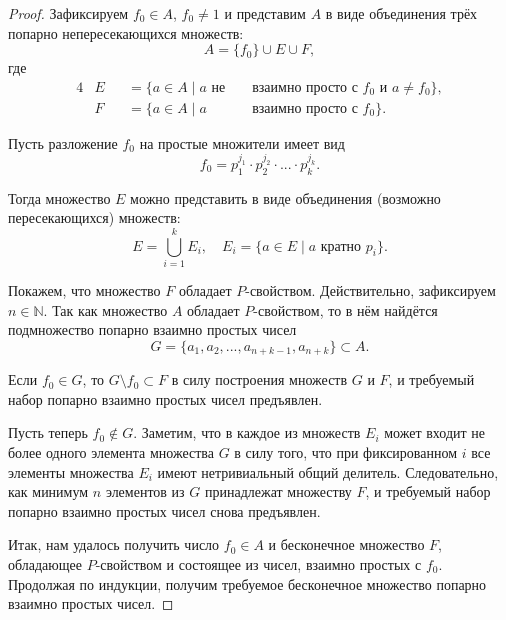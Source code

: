 \documentclass[a4paper,openbib]{article}
\theoremstyle{definition}
\begin{document}
\begin{proof}
	Зафиксируем $f_0\in A$, $f_0 \neq 1$ и представим $A$ в виде объединения трёх попарно непересекающихся множеств:
	\begin{equation}
		A = \{f_0\} \cup E \cup F
		,
	\end{equation}
	где
	\begin{alignat*}{4}
		& E &&= \{ a \in A \mid a \mbox{~не~}&&\mbox{взаимно просто с~} f_0 \mbox{~и~} a\neq f_0\}
		,
		\\
		& F &&= \{ a \in A \mid a            &&\mbox{взаимно просто с~} f_0 \}
		.
	\end{alignat*}

	Пусть разложение $f_0$ на простые множители имеет вид
	\begin{equation}
		f_0 = p_1^{j_1} \cdot p_2^{j_2} \cdot ... \cdot p_k^{j_k}
		.
	\end{equation}

	Тогда множество $E$ можно представить в виде объединения (возможно пересекающихся) множеств:
	\begin{equation}
		E = \bigcup_{i=1}^{k} E_i,\quad E_i = \{a\in E \mid a \mbox{~кратно~} p_i\}
		.
	\end{equation}

	Покажем, что множество $F$ обладает $P$-свойством.
	Действительно, зафиксируем $n\in\mathbb{N}$.
	Так как множество $A$ обладает $P$-свойством,
	то в нём найдётся подмножество попарно взаимно простых чисел
	$$G=\{a_1, a_2, ..., a_{n+k-1}, a_{n+k}\}\subset A.$$

	Если $f_0\in G$, то $G\setminus f_0 \subset F$ в силу построения множеств $G$ и $F$, и требуемый набор попарно взаимно простых чисел предъявлен.

	Пусть теперь $f_0\notin G$.
	Заметим, что в каждое из множеств $E_i$ может входит не более одного элемента множества $G$
	в силу того, что при фиксированном $i$ все элементы множества $E_i$ имеют нетривиальный общий делитель.
	Следовательно, как минимум $n$ элементов из $G$ принадлежат множеству $F$,
	и требуемый набор попарно взаимно простых чисел снова предъявлен.


	Итак, нам удалось получить число $f_0\in A$ и бесконечное множество $F$, обладающее $P$-свойством
	и состоящее из чисел, взаимно простых с $f_0$.
	Продолжая по индукции, получим требуемое бесконечное множество попарно взаимно простых чисел.
\end{proof}
\end{document}
